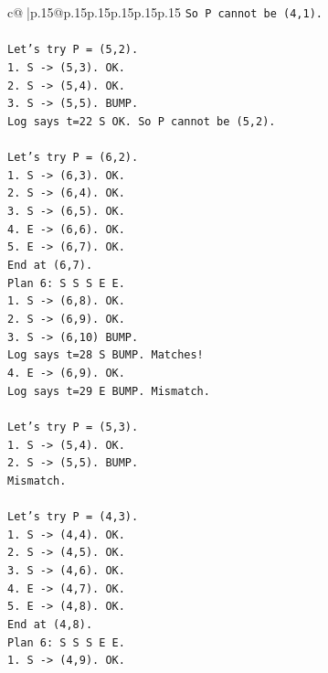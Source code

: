 \documentclass{article}
\begin{document}
{\begin{supertabular}{c@{$\;$}|p{.15\linewidth}@{}p{.15\linewidth}p{.15\linewidth}p{.15\linewidth}p{.15\linewidth}p{.15\linewidth}}
{{{\texttt{So P cannot be (4,1).} \\
\\ 
\texttt{Let's try P = (5,2).} \\
\texttt{1. S {-}> (5,3). OK.} \\
\texttt{2. S {-}> (5,4). OK.} \\
\texttt{3. S {-}> (5,5). BUMP.} \\
\texttt{Log says t=22 S OK. So P cannot be (5,2).} \\
\\ 
\texttt{Let's try P = (6,2).} \\
\texttt{1. S {-}> (6,3). OK.} \\
\texttt{2. S {-}> (6,4). OK.} \\
\texttt{3. S {-}> (6,5). OK.} \\
\texttt{4. E {-}> (6,6). OK.} \\
\texttt{5. E {-}> (6,7). OK.} \\
\texttt{End at (6,7).} \\
\texttt{Plan 6: S S S E E.} \\
\texttt{1. S {-}> (6,8). OK.} \\
\texttt{2. S {-}> (6,9). OK.} \\
\texttt{3. S {-}> (6,10) BUMP.} \\
\texttt{Log says t=28 S BUMP. Matches!} \\
\texttt{4. E {-}> (6,9). OK.} \\
\texttt{Log says t=29 E BUMP. Mismatch.} \\
\\ 
\texttt{Let's try P = (5,3).} \\
\texttt{1. S {-}> (5,4). OK.} \\
\texttt{2. S {-}> (5,5). BUMP.} \\
\texttt{Mismatch.} \\
\\ 
\texttt{Let's try P = (4,3).} \\
\texttt{1. S {-}> (4,4). OK.} \\
\texttt{2. S {-}> (4,5). OK.} \\
\texttt{3. S {-}> (4,6). OK.} \\
\texttt{4. E {-}> (4,7). OK.} \\
\texttt{5. E {-}> (4,8). OK.} \\
\texttt{End at (4,8).} \\
\texttt{Plan 6: S S S E E.} \\
\texttt{1. S {-}> (4,9). OK.} \\
}}}
\end{supertabular}}
\end{document}
